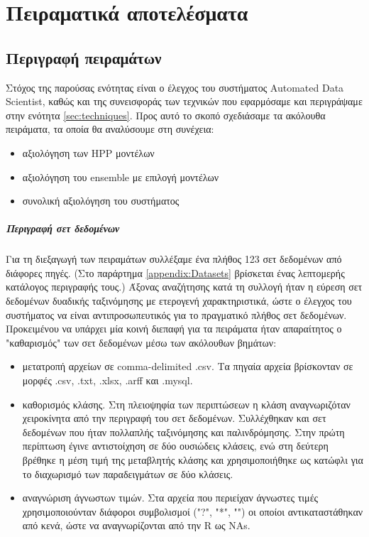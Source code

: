 \chapter{Πειραματικά αποτελέσματα}
\section{Περιγραφή πειραμάτων}
Στόχος της παρούσας ενότητας είναι ο έλεγχος του συστήματος Automated Data Scientist, καθώς και της συνεισφοράς των τεχνικών που εφαρμόσαμε και περιγράψαμε στην ενότητα \ref{sec:techniques}. Προς αυτό το σκοπό σχεδιάσαμε τα ακόλουθα πειράματα, τα οποία θα αναλύσουμε στη συνέχεια:
\begin{itemize}
	\item αξιολόγηση των HPP μοντέλων
	\item αξιολόγηση του ensemble με επιλογή μοντέλων
	\item συνολική αξιολόγηση του συστήματος
\end{itemize}

\paragraph{Περιγραφή σετ δεδομένων} Για τη διεξαγωγή των πειραμάτων συλλέξαμε ένα πλήθος 123 σετ δεδομένων από διάφορες πηγές. (Στο παράρτημα \ref{appendix:Datasets} βρίσκεται ένας λεπτομερής κατάλογος περιγραφής τους.) Άξονας αναζήτησης κατά τη συλλογή ήταν η εύρεση σετ δεδομένων δυαδικής ταξινόμησης με ετερογενή χαρακτηριστικά, ώστε ο έλεγχος του συστήματος να είναι αντιπροσωπευτικός για το πραγματικό πλήθος σετ δεδομένων. Προκειμένου να υπάρχει μία κοινή διεπαφή για τα πειράματα ήταν απαραίτητος ο "καθαρισμός" των σετ δεδομένων μέσω των ακόλουθων βημάτων:
\begin{itemize}
	\item μετατροπή αρχείων σε comma-delimited .csv. Τα πηγαία αρχεία βρίσκονταν σε μορφές .csv, .txt, .xlsx, .arff και .mysql.
	\item καθορισμός κλάσης. Στη πλειοψηφία των περιπτώσεων η κλάση αναγνωριζόταν χειροκίνητα από την περιγραφή του σετ δεδομένων. Συλλέχθηκαν και σετ δεδομένων που ήταν πολλαπλής ταξινόμησης και παλινδρόμησης. Στην πρώτη περίπτωση έγινε αντιστοίχηση σε δύο ουσιώδεις κλάσεις, ενώ στη δεύτερη βρέθηκε η μέση τιμή της μεταβλητής κλάσης και χρησιμοποιήθηκε ως κατώφλι για το διαχωρισμό των παραδειγμάτων σε δύο κλάσεις.
	\item αναγνώριση άγνωστων τιμών. Στα αρχεία που περιείχαν άγνωστες τιμές χρησιμοποιούνταν διάφοροι συμβολισμοί ("?", "*", "") οι οποίοι αντικαταστάθηκαν από κενά, ώστε να αναγνωρίζονται από την R ως NAs.  
\end{itemize}
